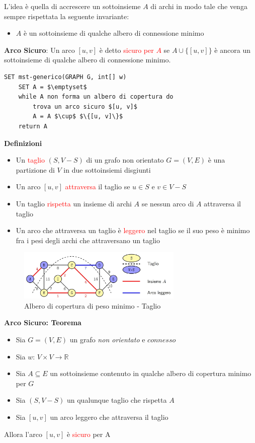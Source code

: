 \documentclass[../cheatSheetAlgoritmi.tex]{subfiles}
\begin{document}
L'idea è quella di accrescere un sottoinsieme $A$ di archi in modo tale che venga sempre rispettata la seguente invariante:
\begin{itemize}
	\item $A$ è un sottoinsieme di qualche albero di connessione minimo
\end{itemize}
\textbf{Arco Sicuro}: Un arco $[u, v]$ è detto \textcolor{red}{sicuro per $A$} se $A \cup \{[u,v]\}$ è ancora un sottoinsieme di qualche albero di connessione minimo.
\begin{lstlisting}[caption=Algoritmo Generico MST]
SET mst-generico(GRAPH G, int[] w)
	SET A = $\emptyset$
	while A non forma un albero di copertura do
		trova un arco sicuro $[u, v]$
		A = A $\cup$ $\{[u, v]\}$
	return A
\end{lstlisting}
\newpage
\begin{flushleft}
\textbf{Definizioni}
\end{flushleft}
\begin{itemize}
	\item Un \textcolor{red}{taglio} $(S, V - S)$ di un grafo non orientato $G = (V, E)$ è una partizione di $V$ in due sottoinsiemi disgiunti
	\item Un arco $[u, v]$ \textcolor{red}{attraversa} il taglio se $u \in S$ e $v \in V - S$
	\item Un taglio \textcolor{red}{rispetta} un insieme di archi $A$ se nessun arco di $A$ attraversa il taglio
	\item Un arco che attraversa un taglio è \textcolor{red}{leggero} nel taglio se il suo peso è minimo fra i pesi degli archi che attraversano un taglio
\end{itemize}
\begin{figure}[h]
	\centering
	\includegraphics[width=0.7\textwidth]{../img/Greedy_4.jpg}
	\caption{Albero di copertura di peso minimo - Taglio}
\end{figure}
\textbf{Arco Sicuro: Teorema}
\begin{itemize}
	\item Sia $G = (V, E)$ un grafo \emph{non orientato} e $connesso$
	\item Sia $w$: $V \times V \rightarrow \mathbb{R}$
	\item Sia $A \subseteq E$ un sottoinsieme contenuto in qualche albero di copertura minimo per $G$
	\item Sia $(S, V - S)$ un qualunque taglio che rispetta $A$
	\item Sia $[u, v]$ un arco leggero che attraversa il taglio
\end{itemize}
Allora l'arco $[u, v]$ è \textcolor{red}{sicuro} per A
\end{document}
